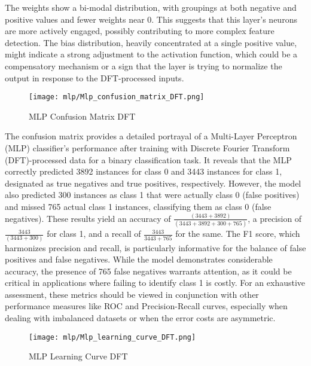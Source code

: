 The weights show a bi-modal distribution, with groupings at both negative and positive values and fewer weights near 0. This suggests that this layer's neurons are more actively engaged, possibly contributing to more complex feature detection. The bias distribution, heavily concentrated at a single positive value, might indicate a strong adjustment to the activation function, which could be a compensatory mechanism or a sign that the layer is trying to normalize the output in response to the DFT-processed inputs.

\begin{figure}[H] 
  \centering
  \texttt{[image: mlp/Mlp\_confusion\_matrix\_DFT.png]}
  \caption{MLP Confusion Matrix DFT}\label{fig:Mlp_confusion_matrix_DFT}
\end{figure}

The confusion matrix provides a detailed portrayal of a Multi-Layer Perceptron (MLP) classifier's performance after training with Discrete Fourier Transform (DFT)-processed data for a binary classification task. It reveals that the MLP correctly predicted 3892 instances for class 0 and 3443 instances for class 1, designated as true negatives and true positives, respectively. However, the model also predicted 300 instances as class 1 that were actually class 0 (false positives) and missed 765 actual class 1 instances, classifying them as class 0 (false negatives). These results yield an accuracy of $\frac{(3443+3892)}{(3443+3892+300+765)}$, a precision of $\frac{3443}{(3443+300)}$ for class 1, and a recall of $\frac{3443}{3443+765}$ for the same. The F1 score, which harmonizes precision and recall, is particularly informative for the balance of false positives and false negatives. While the model demonstrates considerable accuracy, the presence of 765 false negatives warrants attention, as it could be critical in applications where failing to identify class 1 is costly. For an exhaustive assessment, these metrics should be viewed in conjunction with other performance measures like ROC and Precision-Recall curves, especially when dealing with imbalanced datasets or when the error costs are asymmetric.


\begin{figure}[H] 
  \centering
  \texttt{[image: mlp/Mlp\_learning\_curve\_DFT.png]}
  \caption{MLP Learning Curve DFT}\label{fig:Mlp_learning_curve_DFT}
\end{figure}

